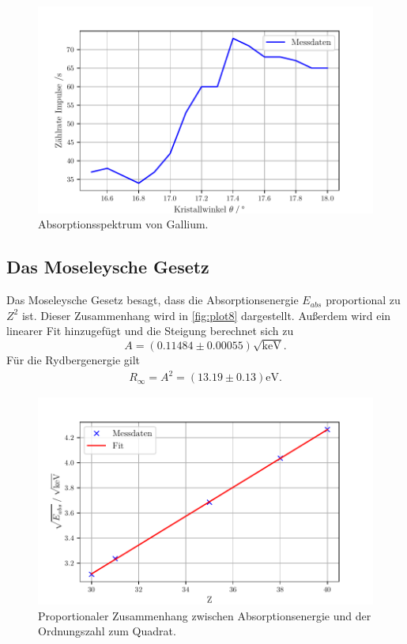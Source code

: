 \begin{figure}[H]
  \centering
  \includegraphics[width=\textwidth]{build/plot7.pdf}
  \caption{Absorptionsspektrum von Gallium.}
  \label{fig:plot7}
\end{figure}



\subsection{Das Moseleysche Gesetz} %
\label{sub:Das Moseleysche Gesetz}
Das Moseleysche Gesetz besagt, dass die Absorptionsenergie $E_{abs}$ proportional zu $Z^2$ ist.
Dieser Zusammenhang wird in \autoref{fig:plot8} dargestellt. Außerdem wird ein linearer Fit hinzugefügt
und die Steigung berechnet sich zu
\begin{equation}
  A = (0.11484 \pm 0.00055) \sqrt{\si{\kilo\electronvolt}}.
\end{equation}
Für die Rydbergenergie gilt
\begin{align}
  R_{\infty} = A^2 = (13.19 \pm 0.13) \si{\electronvolt}.
\end{align}

\begin{figure}[H]
  \centering
  \includegraphics[width=\textwidth]{build/plot8.pdf}
  \caption{Proportionaler Zusammenhang zwischen Absorptionsenergie und der Ordnungszahl zum Quadrat.}
  \label{fig:plot8}
\end{figure}

